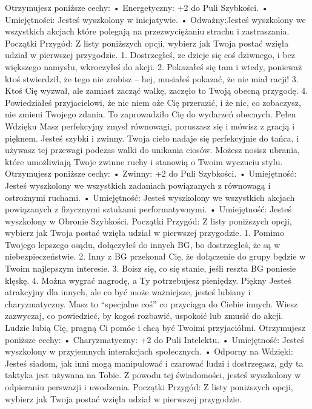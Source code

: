 Otrzymujesz poniższe cechy:
    • Energetyczny: +2 do Puli Szybkości.
    • Umiejętności: Jesteś wyszkolony w inicjatywie. 
    • Odważny:Jesteś wyszkolony we wszystkich akcjach które polegają na przezwyciężaniu strachu i zastraszania. 
Początki Przygód: Z listy poniższych opcji, wybierz jak Twoja postać wzięła udział w pierwszej przygodzie.
1. Dostrzegłeś, ze dzieje się coś dziwnego, i bez większego namysłu, wkroczyłeś do akcji.
2. Pokazałeś się tam i wtedy, ponieważ ktoś stwierdził, że tego nie zrobisz – hej, musiałeś pokazać, że nie miał racji!
3. Ktoś Cię wyzwał, ale zamiast zacząć walkę, zaczęło to Twoją obecną przygodę.
4. Powiedziałeś przyjacielowi, że nic niem oże Cię przerazić, i że nic, co zobaczysz, nie zmieni Twojego zdania. To zaprowadziło Cię do wydarzeń obecnych. 
Pełen Wdzięku
Masz perfekcyjny zmysł równowagi, poruszasz się i mówisz z gracją i pięknem. Jesteś szybki i zwinny. Twoja cieło nadaje się perfekcyjnie do tańca, i używasz tej przewagi podczas walki do unikania ciosów. Możesz nosisz ubrania, które umożliwiają Twoje zwinne ruchy i stanowią o Twoim wyczuciu stylu.
Otrzymujesz poniższe cechy:
    • Zwinny: +2 do Puli Szybkości.
    • Umiejętność: Jesteś wyszkolony we wszystkich zadaniach powiązanych z równowagą i ostrożnymi ruchami.
    • Umiejętność: Jesteś wyszkolony we wszystkich akcjach powiązanych z fizycznymi sztukami performatywnymi.
    • Umiejętność: Jesteś wyszkolony w Obronie Szybkości.
Początki Przygód: Z listy poniższych opcji, wybierz jak Twoja postać wzięła udział w pierwszej przygodzie.
1. Pomimo Twojego lepszego osądu, dołączyłeś do innych BG, bo dostrzegłeś, że są w niebezpieczeństwie.  
2. Inny z BG przekonał Cię, że dołączenie do grupy będzie w Twoim najlepszym interesie.
3. Boisz się, co się stanie, jeśli reszta BG poniesie klęskę.
4. Można wygrać nagrodę, a Ty potrzebujesz pieniędzy.
Piękny
Jesteś atrakcyjny dla innych, ale co być może ważniejsze, jesteś lubiany i charyzmatyczny. Masz to “specjalne coś” co przyciąga do Ciebie innych. Wiesz zazwyczaj, co powiedzieć, by kogoś rozbawić, uspokoić lub zmusić do akcji. Ludzie lubią Cię, pragną Ci pomóc i chcą być Twoimi przyjaciółmi. 
Otrzymujesz poniższe cechy:
    • Charyzmatyczny: +2 do Puli Intelektu.
    • Umiejętność: Jesteś wyszkolony w przyjemnych interakcjach społecznych.
    • Odporny na Wdzięki: Jesteś siadom, jak inni mogą manipulować i czarować ludzi i dostrzegasz, gdy ta taktyka jest używana na Tobie. Z powodu tej świadomości, jesteś wyszkolony w odpieraniu perswazji i uwodzenia.
Początki Przygód: Z listy poniższych opcji, wybierz jak Twoja postać wzięła udział w pierwszej przygodzie.
